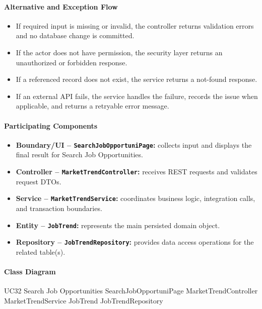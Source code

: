 \paragraph{Alternative and Exception Flow}

\begin{itemize}
    \item If required input is missing or invalid, the controller returns validation errors and no database change is committed.
    \item If the actor does not have permission, the security layer returns an unauthorized or forbidden response.
    \item If a referenced record does not exist, the service returns a not-found response.
    \item If an external API fails, the service handles the failure, records the issue when applicable, and returns a retryable error message.
\end{itemize}

\paragraph{Participating Components}

\begin{itemize}
    \item \textbf{Boundary/UI -- \texttt{SearchJobOpportuniPage}:} collects input and displays the final result for Search Job Opportunities.
    \item \textbf{Controller -- \texttt{MarketTrendController}:} receives REST requests and validates request DTOs.
    \item \textbf{Service -- \texttt{MarketTrendService}:} coordinates business logic, integration calls, and transaction boundaries.
    \item \textbf{Entity -- \texttt{JobTrend}:} represents the main persisted domain object.
    \item \textbf{Repository -- \texttt{JobTrendRepository}:} provides data access operations for the related table(s).
\end{itemize}

\paragraph{Class Diagram}

\ClassDiagram
{UC32 Search Job Opportunities}
{SearchJobOpportuniPage}
{MarketTrendController}
{MarketTrendService}
{JobTrend}
{JobTrendRepository}

